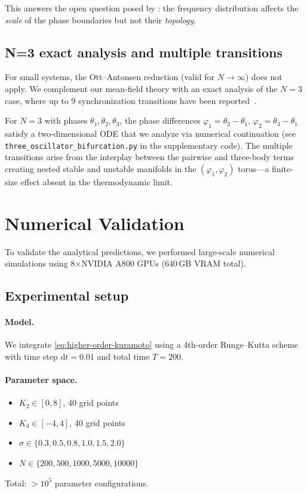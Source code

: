 \documentclass{article}
\newcommand{\dd}{\mathrm{d}}
\begin{document}
This answers the open question posed by \citet{Muolo2025}: the frequency
distribution affects the \emph{scale} of the phase boundaries but not their
\emph{topology}.

\subsection{N=3 exact analysis and multiple transitions}

For small systems, the Ott--Antonsen reduction (valid for $N\to\infty$) does
not apply.  We complement our mean-field theory with an exact analysis of the
$N=3$ case, where up to 9 synchronization transitions have been
reported~\citep{Dai2025}.

For $N=3$ with phases $\theta_1,\theta_2,\theta_3$, the phase differences
$\varphi_1=\theta_2-\theta_1$, $\varphi_2=\theta_3-\theta_1$ satisfy a
two-dimensional ODE that we analyze via numerical continuation
(see \texttt{three\_oscillator\_bifurcation.py} in the supplementary code).
The multiple transitions arise from the interplay between the pairwise and
three-body terms creating nested stable and unstable manifolds in the
$(\varphi_1,\varphi_2)$ torus---a finite-size effect absent in the
thermodynamic limit.


\section{Numerical Validation}
\label{sec:numerics}

To validate the analytical predictions, we performed large-scale numerical
simulations using 8$\times$NVIDIA A800 GPUs (640\,GB VRAM total).

\subsection{Experimental setup}

\paragraph{Model.}
We integrate \eqref{eq:higher-order-kuramoto} using a 4th-order Runge--Kutta
scheme with time step $\dd t=0.01$ and total time $T=200$.

\paragraph{Parameter space.}
\begin{itemize}
  \item $K_2\in[0,8]$, 40 grid points
  \item $K_3\in[-4,4]$, 40 grid points
  \item $\sigma\in\{0.3, 0.5, 0.8, 1.0, 1.5, 2.0\}$
  \item $N\in\{200, 500, 1000, 5000, 10000\}$
\end{itemize}
Total: $>10^5$ parameter configurations.
\end{document}
